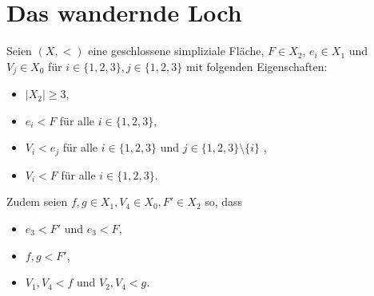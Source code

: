 \documentclass[12pt,titlepage]{article}
\begin{document}
\section{Das wandernde Loch}
 Seien $(X,<)$ eine geschlossene simpliziale Fläche, $F \in X_{2}$, $e_{i} \in X_{1}$ und $V_{j} \in X_{0}$ für $i \in \{1,2,3\},j \in \{1,2,3\}$ mit folgenden Eigenschaften:
 \begin{itemize}
 \item $\vert X_{2}\vert \geq 3$,
 \item $e_{i} < F$ für alle $i \in \{1,2,3\}$,
 \item $V_{i}<e_{j}$ für alle $i \in \{1,2,3\}$ und $j \in \{1,2,3\} \setminus\{i\}$ ,
 \item $V_{i} < F$ für alle $i \in \{1,2,3\}$.
\end{itemize}  
Zudem seien $f,g \in X_1,V_4 \in X_0,F' \in X_2$ so, dass
\begin{itemize}
\item $e_3<F'$ und $e_3<F$,
\item $f,g <F'$, 
\item $V_1,V_4<f$ und $V_2,V_4<g$.
\end{itemize}
\end{document}
